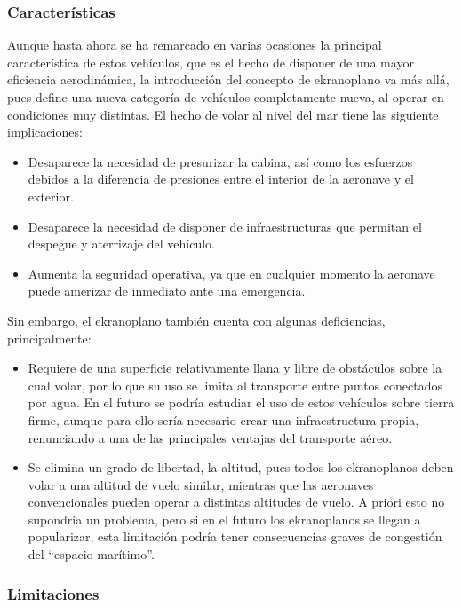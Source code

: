 \subsubsection{Características}
\label{sec:wig:ekranoplane:characteristics}

Aunque hasta ahora se ha remarcado en varias ocasiones la principal característica de estos vehículos, que es el hecho de disponer de una mayor eficiencia aerodinámica, la introducción del concepto de ekranoplano va más allá, pues define una nueva categoría de vehículos completamente nueva, al operar en condiciones muy distintas. El hecho de volar al nivel del mar tiene las siguiente implicaciones:
\begin{itemize}
\item Desaparece la necesidad de presurizar la cabina, así como los esfuerzos debidos a la diferencia de presiones entre el interior de la aeronave y el exterior.
\item Desaparece la necesidad de disponer de infraestructuras que permitan el despegue y aterrizaje del vehículo.
\item Aumenta la seguridad operativa, ya que en cualquier momento la aeronave puede amerizar de inmediato ante una emergencia.
\end{itemize}

Sin embargo, el ekranoplano también cuenta con algunas deficiencias, principalmente:
\begin{itemize}
\item Requiere de una superficie relativamente llana y libre de obstáculos sobre la cual volar, por lo que su uso se limita al transporte entre puntos conectados por agua. En el futuro se podría estudiar el uso de estos vehículos sobre tierra firme, aunque para ello sería necesario crear una infraestructura propia, renunciando a una de las principales ventajas del transporte aéreo.
\item Se elimina un grado de libertad, la altitud, pues todos los ekranoplanos deben volar a una altitud de vuelo similar, mientras que las aeronaves convencionales pueden operar a distintas altitudes de vuelo. A priori esto no supondría un problema, pero si en el futuro los ekranoplanos se llegan a popularizar, esta limitación podría tener consecuencias graves de congestión del “espacio marítimo”.
\end{itemize}


\subsubsection{Limitaciones}
\label{sec:wig:ekranoplane:limitations}

